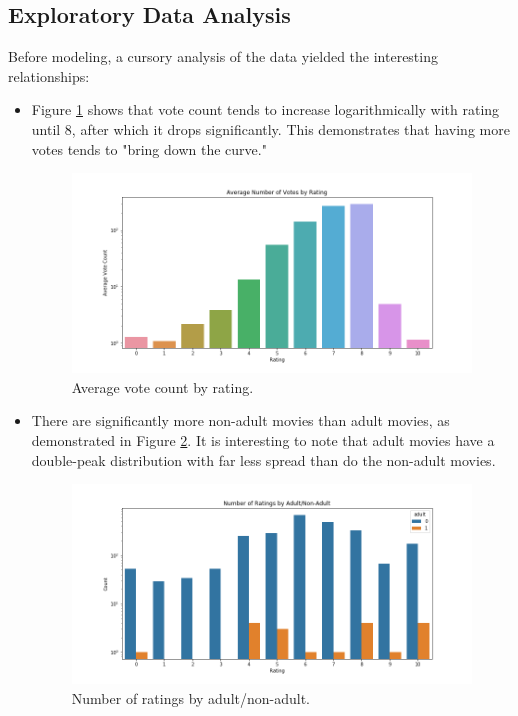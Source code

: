 \documentclass[12pt, oneside]{article}   	%
\begin{document}
\subsection{Exploratory Data Analysis}

Before modeling, a cursory analysis of the data yielded the interesting relationships:

\begin{itemize}

\item Figure \ref{fig:vote_count_by_rating} shows that vote count tends to increase logarithmically with rating until 8, after which it drops significantly. This demonstrates that having more votes tends to "bring down the curve."

\begin{figure}
\includegraphics[width=\textwidth]{vote_count_by_rating}
\caption{\label{fig:vote_count_by_rating}Average vote count by rating.}
\end{figure}

\item There are significantly more non-adult movies than adult movies, as demonstrated in Figure \ref{fig:ratings_by_adult}. It is interesting to note that adult movies have a double-peak distribution with far less spread than do the non-adult movies.

\begin{figure}
\includegraphics[width=\textwidth]{ratings_by_adult}
\caption{\label{fig:ratings_by_adult}Number of ratings by adult/non-adult.}
\end{figure}


\end{itemize}
\end{document}
